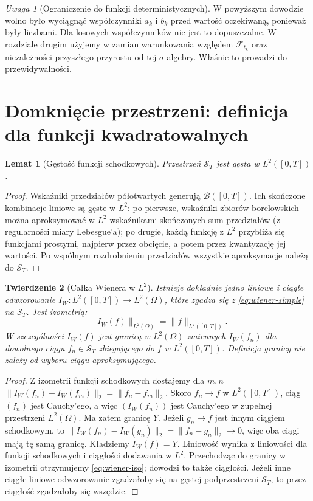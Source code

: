 \documentclass[11pt,a4paper,oneside]{report}
\numberwithin{equation}{chapter}
\theoremstyle{plain}
\newtheorem{twierdzenie}{Twierdzenie}[chapter]
\newtheorem{lemat}[twierdzenie]{Lemat}
\theoremstyle{definition}
\theoremstyle{remark}
\newtheorem{uwaga}{Uwaga}[chapter]
\newcommand{\calF}{\mathcal{F}}
\newcommand{\calB}{\mathcal{B}}
\newcommand{\calS}{\mathcal{S}}
\newcommand{\norm}[1]{\lVert #1\rVert}
\begin{document}
\begin{uwaga}[Ograniczenie do funkcji deterministycznych]
W powyższym dowodzie wolno było wyciągnąć współczynniki
$a_k$ i $b_k$ przed wartość oczekiwaną, ponieważ były liczbami.
Dla losowych współczynników nie jest to dopuszczalne.
W rozdziale drugim użyjemy w zamian warunkowania względem
$\calF_{t_k}$ oraz niezależności przyszłego przyrostu od tej
$\sigma$-algebry. Właśnie to prowadzi do przewidywalności.
\end{uwaga}

\section{Domknięcie przestrzeni: definicja dla funkcji kwadratowalnych}
\begin{lemat}[Gęstość funkcji schodkowych]
Przestrzeń $\calS_T$ jest gęsta w $L^2([0,T])$.
\end{lemat}
\begin{proof}
Wskaźniki przedziałów półotwartych generują $\calB([0,T])$.
Ich skończone kombinacje liniowe są gęste w $L^2$:
po pierwsze, wskaźniki zbiorów borelowskich można
aproksymować w $L^2$ wskaźnikami skończonych sum przedziałów
(z regularności miary Lebesgue'a); po drugie,
każdą funkcję z $L^2$ przybliża się funkcjami prostymi,
najpierw przez obcięcie, a potem przez kwantyzację jej wartości.
Po wspólnym rozdrobnieniu przedziałów wszystkie aproksymacje
należą do $\calS_T$.
\end{proof}

\begin{twierdzenie}[Całka Wienera w $L^2$]\label{th:wiener-extension}
Istnieje dokładnie jedno liniowe i ciągłe odwzorowanie
$I_W:L^2([0,T])\to L^2(\Omega)$, które zgadza się z
\eqref{eq:wiener-simple} na $\calS_T$. Jest izometrią:
\[
\norm{I_W(f)}_{L^2(\Omega)}=\norm{f}_{L^2([0,T])}.
\tag{1.3}\label{eq:wiener-iso}
\]
W szczególności $I_W(f)$ jest granicą w $L^2(\Omega)$
zmiennych $I_W(f_n)$ dla dowolnego ciągu $f_n\in\calS_T$
zbiegającego do $f$ w $L^2([0,T])$. Definicja granicy
nie zależy od wyboru ciągu aproksymującego.
\end{twierdzenie}
\begin{proof}
Z izometrii funkcji schodkowych dostajemy dla $m,n$
$\norm{I_W(f_n)-I_W(f_m)}_2=\norm{f_n-f_m}_2$.
Skoro $f_n\to f$ w $L^2([0,T])$, ciąg $(f_n)$ jest Cauchy'ego,
a więc $(I_W(f_n))$ jest Cauchy'ego w zupełnej przestrzeni
$L^2(\Omega)$. Ma zatem granicę $Y$. Jeżeli $g_n\to f$
jest innym ciągiem schodkowym, to
$\norm{I_W(f_n)-I_W(g_n)}_2=\norm{f_n-g_n}_2\to0$,
więc oba ciągi mają tę samą granicę. Kładziemy $I_W(f)=Y$.
Liniowość wynika z liniowości dla funkcji schodkowych i
ciągłości dodawania w $L^2$. Przechodząc do granicy w izometrii
otrzymujemy \eqref{eq:wiener-iso}; dowodzi to także ciągłości.
Jeżeli inne ciągłe liniowe odwzorowanie zgadzałoby się na gęstej
podprzestrzeni $\calS_T$, to przez ciągłość zgadzałoby się
wszędzie.
\end{proof}
\end{document}

